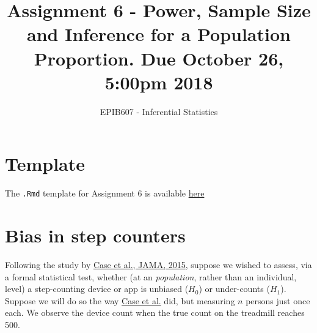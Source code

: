 \documentclass[letterpaper,9pt,twoside,printwatermark=false]{pinp}
\title{Assignment 6 - Power, Sample Size and Inference for a Population
Proportion. Due October 26, 5:00pm 2018}
\author[a]{EPIB607 - Inferential Statistics}
\affil[a]{Fall 2018, McGill University}
\begin{document}
\verticaladjustment{-2pt}

\maketitle
\thispagestyle{firststyle}



\section*{Template}\label{template}

The \texttt{.Rmd} template for Assignment 6 is available
\href{https://github.com/sahirbhatnagar/EPIB607/raw/master/assignments/a6/a6_template.Rmd}{here}

\section{Bias in step counters}\label{bias-in-step-counters}

Following the study by
\href{http://www.medicine.mcgill.ca/epidemiology/hanley/bios601/Surveys/SmartphoneSteps.pdf}{Case
et al., JAMA, 2015}, suppose we wished to assess, via a formal
statistical test, whether (at an \textit{population}, rather than an
individual, level) a step-counting device or app is unbiased (\(H_0\))
or under-counts (\(H_1\)). Suppose we will do so the way
\href{http://www.medicine.mcgill.ca/epidemiology/hanley/bios601/Surveys/SmartphoneSteps.pdf}{Case
et al.} did, but measuring \(n\) persons just once each. We observe the
device count when the true count on the treadmill reaches 500.
\end{document}
